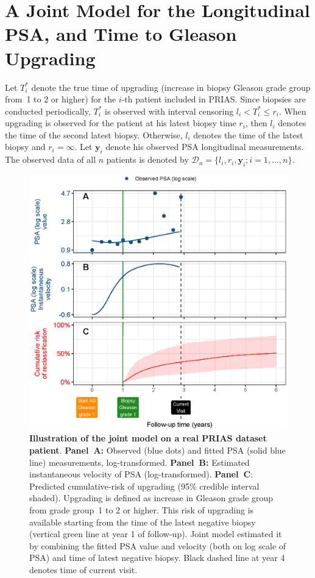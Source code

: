 \section{A Joint Model for the Longitudinal PSA, and Time to Gleason Upgrading}
\label{sec:jm_framework}

Let $T_i^*$ denote the true time of upgrading (increase in biopsy Gleason grade group from~1 to 2 or higher) for the ${i\mbox{-th}}$ patient included in PRIAS. Since biopsies are conducted periodically, $T_i^*$ is observed with interval censoring ${l_i < T_i^* \leq r_i}$. When upgrading is observed for the patient at his latest biopsy time $r_i$, then $l_i$ denotes the time of the second latest biopsy. Otherwise, $l_i$ denotes the time of the latest biopsy and ${r_i=\infty}$. Let $\boldsymbol{y}_{i}$ denote his observed PSA longitudinal measurements. The observed data of all $n$ patients is denoted by ${\mathcal{D}_n = \{l_i, r_i, \boldsymbol{y}_{i}; i = 1, \ldots, n\}}$.

\begin{figure}
\centerline{\includegraphics[width=\columnwidth]{images/jmExplanationPlot_113.eps}}
\caption{\textbf{Illustration of the joint model on a real PRIAS dataset patient}. \textbf{Panel~A:} Observed (blue dots) and fitted PSA (solid blue line) measurements, log-transformed. \textbf{Panel~B:} Estimated instantaneous velocity of PSA (log-transformed). \textbf{Panel~C}: Predicted cumulative-risk of upgrading (95\% credible interval shaded). Upgrading is defined as increase in Gleason grade group \citep{epsteinGG2014} from grade group~1 to 2 or higher. This risk of upgrading is available starting from the time of the latest negative biopsy (vertical green line at year 1 of follow-up). Joint model estimated it by combining the fitted PSA value and velocity (both on log scale of PSA) and time of latest negative biopsy. Black dashed line at year 4 denotes time of current visit.}
\label{fig:jmExplanationPlot_113}
\end{figure}

